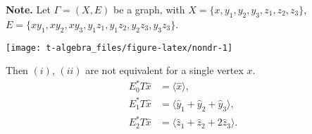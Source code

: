 \documentclass[
]{book}
\theoremstyle{definition}
\theoremstyle{definition}
\theoremstyle{definition}
\theoremstyle{definition}
\theoremstyle{remark}
\begin{document}
\textbf{Note.}
Let \(\Gamma = (X, E)\) be a graph, with \(X = \{x, y_1, y_2, y_3, z_1, z_2, z_3\}\), \(E = \{xy_1, xy_2, xy_3, y_1z_1, y_1z_2, y_2z_3, y_3z_3\}\).

\begin{center}\texttt{[image: t-algebra\_files/figure-latex/nondr-1]} \end{center}

Then \((i)\), \((ii)\) are not equivalent for a single vertex \(x\).
\begin{align}
E^*_0T\hat{x} & = \langle \hat{x}\rangle, \\
E^*_1T\hat{x} & = \langle \hat{y}_1 + \hat{y}_2 + \hat{y}_3\rangle, \\
E^*_2T\hat{x} & = \langle \hat{z}_1 + \hat{z}_2 + 2\hat{z}_3\rangle.
\end{align}
\end{document}
